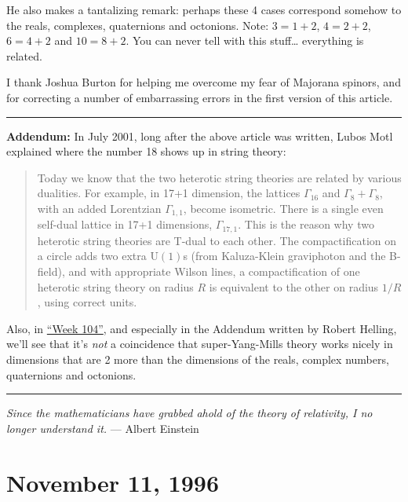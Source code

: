 \documentclass{article}
\begin{document}
He also makes a tantalizing remark: perhaps these 4 cases correspond
somehow to the reals, complexes, quaternions and octonions. Note:
\(3 = 1 + 2\), \(4 = 2 + 2\), \(6 = 4 + 2\) and \(10 = 8 + 2\). You can
never tell with this stuff\ldots{} everything is related.

I thank Joshua Burton for helping me overcome my fear of Majorana
spinors, and for correcting a number of embarrassing errors in the first
version of this article.

\begin{center}\rule{0.5\linewidth}{0.5pt}\end{center}

\textbf{Addendum:} In July 2001, long after the above article was
written, Lubos Motl explained where the number 18 shows up in string
theory:

\begin{quote}
Today we know that the two heterotic string theories are related by
various dualities. For example, in 17+1 dimension, the lattices
\(\Gamma_{16}\) and \(\Gamma_8+\Gamma_8\), with an added Lorentzian
\(\Gamma_{1,1}\), become isometric. There is a single even self-dual
lattice in 17+1 dimensions, \(\Gamma_{17,1}\). This is the reason why
two heterotic string theories are T-dual to each other. The
compactification on a circle adds two extra \(\mathrm{U}(1)\)s (from
Kaluza-Klein graviphoton and the B-field), and with appropriate Wilson
lines, a compactification of one heterotic string theory on radius \(R\)
is equivalent to the other on radius \(1/R\), using correct units.
\end{quote}

Also, in \protect\hyperlink{week104}{``Week 104''}, and especially in
the Addendum written by Robert Helling, we'll see that it's \emph{not} a
coincidence that super-Yang-Mills theory works nicely in dimensions that
are 2 more than the dimensions of the reals, complex numbers,
quaternions and octonions.

\begin{center}\rule{0.5\linewidth}{0.5pt}\end{center}

\emph{Since the mathematicians have grabbed ahold of the theory of
relativity, I no longer understand it.} --- Albert Einstein



\hypertarget{week94}{%
\section{November 11, 1996}\label{week94}}
\end{document}
